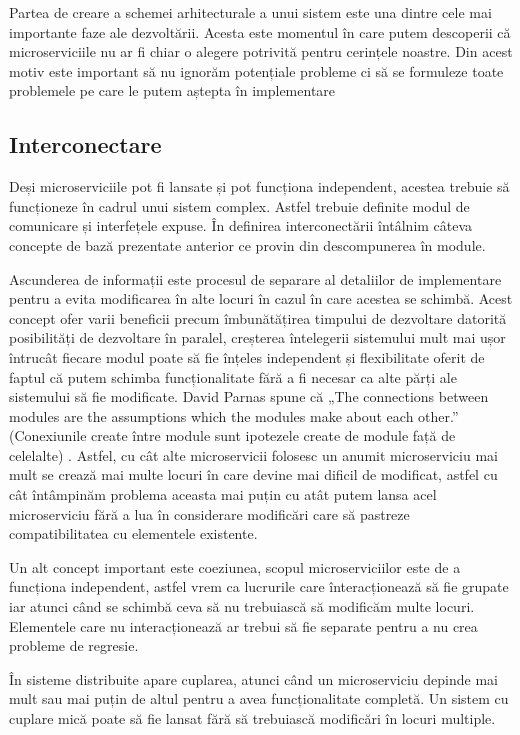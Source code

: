 Partea de creare a schemei arhitecturale a unui sistem este una dintre
cele mai importante faze ale dezvoltării. Acesta este momentul în care putem descoperii
că microserviciile nu ar fi chiar o alegere potrivită pentru cerințele noastre. Din acest
motiv este important să nu ignorăm potențiale probleme ci să se formuleze toate problemele
pe care le putem aștepta în implementare

\subsection{Interconectare}
Deși microserviciile pot fi lansate și pot funcționa independent, acestea trebuie să funcționeze
în cadrul unui sistem complex. Astfel trebuie definite modul de comunicare și interfețele expuse.
În definirea interconectării întâlnim câteva concepte de bază prezentate anterior ce provin
din descompunerea în module.

Ascunderea de informații este procesul de separare al detaliilor de implementare pentru a evita
modificarea în alte locuri în cazul în care acestea se schimbă. Acest concept ofer varii beneficii
precum îmbunătățirea timpului de dezvoltare datorită posibilități de dezvoltare în paralel,
creșterea întelegerii sistemului mult mai ușor întrucât fiecare modul poate să fie înțeles
independent și flexibilitate oferit de faptul că putem schimba funcționalitate fără a fi necesar
ca alte părți ale sistemului să fie modificate. David Parnas spune că „The connections between modules are the assumptions which the modules make about
each other.” (Conexiunile create între module sunt ipotezele create de module față de celelalte) \cite{DBLP:conf/ifip/Parnas71}.
Astfel, cu cât alte microservicii folosesc un anumit microserviciu mai mult se crează mai multe
locuri în care devine mai dificil de modificat, astfel cu cât întâmpinăm problema aceasta mai puțin
cu atât putem lansa acel microserviciu fără a lua în considerare modificări care să pastreze compatibilitatea
cu elementele existente.

Un alt concept important este coeziunea, scopul microserviciilor este de a funcționa independent,
astfel vrem ca lucrurile care înteracționează să fie grupate iar atunci când se schimbă ceva 
să nu trebuiască să modificăm multe locuri. Elementele care nu interacționează ar trebui să fie separate
pentru a nu crea probleme de regresie.

În sisteme distribuite apare cuplarea, atunci când un microserviciu depinde mai mult sau mai puțin de
altul pentru a avea funcționalitate completă. Un sistem cu cuplare mică poate să fie lansat fără să trebuiască
modificări în locuri multiple.

